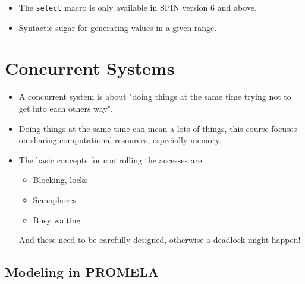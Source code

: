 \documentclass[a4paper, 11pt, accentcolor = tud3b]{tudreport}
\newcommand{\inlinePromela}[1]{\lstinline[language = PROMELA]|#1|}
\begin{document}
					\begin{itemize}
						\item The \inlinePromela{select} macro is only available in SPIN version 6 and above.
						\item Syntactic sugar for generating values in a given range.
					\end{itemize}

		\section{Concurrent Systems}
			\begin{itemize}
				\item A concurrent system is about "doing things at the same time trying not to get into each others way".
				\item Doing things at the same time can mean a lots of things, this course focuses on sharing computational resources, especially memory.
				\item The basic concepts for controlling the accesses are:
					\begin{itemize}
						\item Blocking, locks
						\item Semaphores
						\item Busy waiting
					\end{itemize}
					And these need to be carefully designed, otherwise a deadlock might happen!
			\end{itemize}
		
			\subsection{Modeling in PROMELA}
				
			
\end{document}
